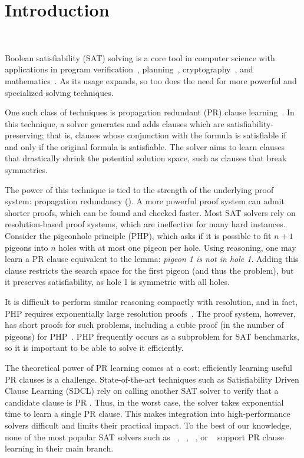 \section{Introduction}~\label{sec:intro}


Boolean satisfiability (SAT) solving is a core tool in computer science with
applications in program
verification~\cite{BillionQueries,sat-hardwareverification,ic3,bmc},
planning~\cite{planning,planningassat}, cryptography~\cite{cryptominisat}, and
mathematics~\cite{chromaticnumber,pythagoreantriples,kellersconjecture,emptyhexagon}.
As its usage expands, so too does the need for more powerful and specialized
solving techniques.


One such class of techniques is propagation redundant (PR) clause
learning~\cite{prclauses}. In this technique, a solver generates and adds
clauses which are satisfiability-preserving; that is, clauses whose conjunction
with the formula is satisfiable if and only if the original formula is
satisfiable. The solver aims to learn clauses that drastically shrink the
potential solution space, such as clauses that break symmetries.


The power of this technique is tied to the strength of the underlying proof
system: propagation redundancy (\pr). A more powerful proof system can admit
shorter proofs, which can be found and checked faster. Most SAT solvers rely on
resolution-based proof systems, which are ineffective for many hard instances.
Consider the pigeonhole principle (PHP), which asks if it is possible to fit
$n+1$ pigeons into $n$ holes with at most one pigeon per hole. Using \pr
reasoning, one may learn a PR clause equivalent to the lemma: \emph{pigeon 1 is
not in hole 1}. Adding this clause restricts the search space for the first
pigeon (and thus the problem), but it preserves satisfiability, as hole 1 is
symmetric with all holes. 

It is difficult to perform similar reasoning compactly with resolution, and in
fact, PHP requires exponentially large resolution proofs~\cite{hakenpigeonhole}.
The \pr proof system, however, has short proofs for such problems, including a
cubic proof (in the number of pigeons) for PHP~\cite{prclauses}. PHP frequently
occurs as a subproblem for SAT benchmarks, so it is important to be able to
solve it efficiently.

The theoretical power of PR learning comes at a cost: efficiently learning
useful PR clauses is a challenge. State-of-the-art techniques such as
Satisfiability Driven Clause Learning (SDCL) rely on calling another SAT solver
to verify that a candidate clause is PR \cite{sadical}. 
Thus, in the worst case, the solver takes exponential time to learn a single PR
clause. This makes integration into high-performance solvers difficult and
limits their practical impact. To the best of our knowledge, none of the most popular SAT solvers
such as \cadical~\cite{cadical}, \kissat~\cite{kissat},
\cryptoMiniSAT~\cite{cryptominisat}, or \lingeling~\cite{lingeling} support
PR clause learning in their main branch.

